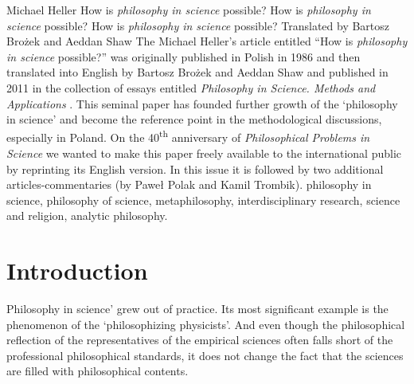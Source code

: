 \begin{artengenv}{Michael Heller}
	{How is \textit{philosophy in science} possible?}
	{How is \textit{philosophy in science} possible?}
	{How is \textit{philosophy in science} possible?}
	{Translated by Bartosz Brożek and Aeddan Shaw\label{heller-start}}
	{The Michael Heller's article entitled ``How is \textit{philosophy in science} possible?'' was originally published in Polish in 1986
		\parencite[see][]{heller_jakmozliwa_1986} and then translated into English by Bartosz Brożek and Aeddan Shaw and published in 2011 in the collection of essays entitled \textit{Philosophy in Science. Methods and Applications} \parencite{heller_howpossible_2011}. This seminal paper has founded further growth of the `philosophy in science' and become the reference point in the methodological discussions, especially in Poland. On the 40\textsuperscript{th} anniversary of \textit{Philosophical Problems in Science} we wanted to make this paper freely available to the international public by reprinting its English version. In this issue it is followed by two additional articles-commentaries (by Paweł Polak and Kamil Trombik).}
	{philosophy in science, philosophy of science, metaphilosophy, interdisciplinary research, science and religion, analytic philosophy.}



\section{Introduction}


\lettrine[loversize=0.13,lines=2,lraise=-0.05,nindent=0em,findent=0.2pt]%
{P}{}hilosophy in science' grew out of practice.\label{heller-out-of} Its most significant example is the phenomenon of the `philosophizing
physicists'. And even though the philosophical reflection of the representatives of the empirical sciences often falls
short of the professional philosophical standards, it does not change the fact that the sciences are filled with
philosophical contents.

%


\end{artengenv}
